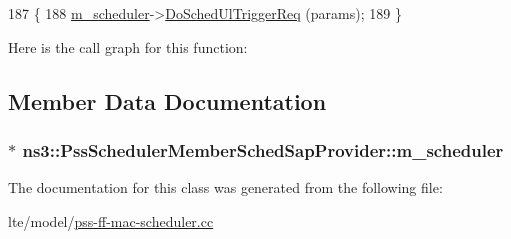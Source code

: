\begin{DoxyCode}
187 \{
188   \hyperlink{classns3_1_1PssSchedulerMemberSchedSapProvider_ad5467aa7af46504e7e53a99163b1efbc}{m\_scheduler}->\hyperlink{classns3_1_1PssFfMacScheduler_a9179ed7943c4bc8cd4c6cdc4e35a8cb7}{DoSchedUlTriggerReq} (params);
189 \}
\end{DoxyCode}


Here is the call graph for this function\+:




\subsection{Member Data Documentation}
\subsubsection[{\texorpdfstring{m\+\_\+scheduler}{m_scheduler}}]{ $\ast$ ns3\+::\+Pss\+Scheduler\+Member\+Sched\+Sap\+Provider\+::m\+\_\+scheduler\hspace{0.3cm}{\ttfamily [private]}}\hypertarget{classns3_1_1PssSchedulerMemberSchedSapProvider_ad5467aa7af46504e7e53a99163b1efbc}{}\label{classns3_1_1PssSchedulerMemberSchedSapProvider_ad5467aa7af46504e7e53a99163b1efbc}


The documentation for this class was generated from the following file\+:\begin{DoxyCompactItemize}
\item 
lte/model/\hyperlink{lte_2model_2pss-ff-mac-scheduler_8cc}{pss-\/ff-\/mac-\/scheduler.\+cc}\end{DoxyCompactItemize}
